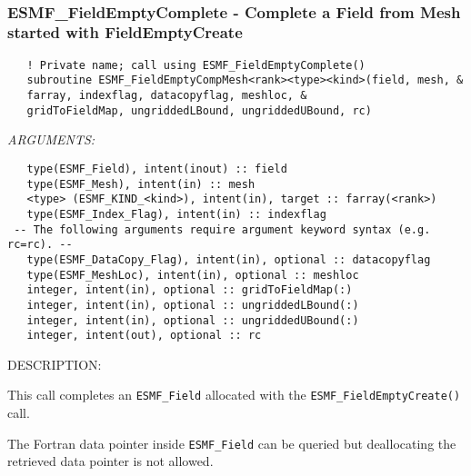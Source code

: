  
\mbox{}\hrulefill\ 
 
\subsubsection [ESMF\_FieldEmptyComplete] {ESMF\_FieldEmptyComplete - Complete a Field from Mesh started with FieldEmptyCreate }


   
\begin{verbatim}   ! Private name; call using ESMF_FieldEmptyComplete() 
   subroutine ESMF_FieldEmptyCompMesh<rank><type><kind>(field, mesh, & 
   farray, indexflag, datacopyflag, meshloc, & 
   gridToFieldMap, ungriddedLBound, ungriddedUBound, rc) 
   \end{verbatim}{\em ARGUMENTS:}
\begin{verbatim}   type(ESMF_Field), intent(inout) :: field 
   type(ESMF_Mesh), intent(in) :: mesh 
   <type> (ESMF_KIND_<kind>), intent(in), target :: farray(<rank>) 
   type(ESMF_Index_Flag), intent(in) :: indexflag 
 -- The following arguments require argument keyword syntax (e.g. rc=rc). --
   type(ESMF_DataCopy_Flag), intent(in), optional :: datacopyflag 
   type(ESMF_MeshLoc), intent(in), optional :: meshloc 
   integer, intent(in), optional :: gridToFieldMap(:) 
   integer, intent(in), optional :: ungriddedLBound(:) 
   integer, intent(in), optional :: ungriddedUBound(:) 
   integer, intent(out), optional :: rc 
   \end{verbatim}
{\sf DESCRIPTION:\\ }

 
   This call completes an {\tt ESMF\_Field} allocated with the 
   {\tt ESMF\_FieldEmptyCreate()} call. 
   
   The Fortran data pointer inside {\tt ESMF\_Field} can be queried but deallocating 
   the retrieved data pointer is not allowed. 
   
